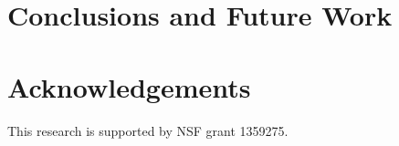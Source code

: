 \documentclass[conference]{IEEEtran}
\begin{document}
\section{Conclusions and Future Work}

\section*{Acknowledgements}
\begin{center}
	This research is supported by NSF grant 1359275.
\end{center}



\end{document}
